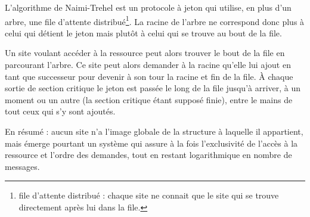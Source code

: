 L'algorithme de Naimi-Trehel est un protocole à jeton qui utilise, en plus d'un arbre, une file d'attente distribué\footnote{file d'attente distribué : chaque site ne connait que le site qui se trouve directement après lui dans la file.}. La racine de l'arbre ne correspond donc plus à celui qui détient le jeton mais plutôt à celui qui se trouve au bout de la file.

Un site voulant accéder à la ressource peut alors trouver le bout de la file en parcourant l'arbre. Ce site peut alors demander à la racine qu'elle lui ajout en tant que successeur pour devenir à son tour la racine et fin de la file. À chaque sortie de section critique le jeton est passée le long de la file jusqu'à arriver, à un moment ou un autre (la section critique étant supposé finie), entre le mains de tout ceux qui s'y sont ajoutés.

En résumé : aucun site n'a l'image globale de la structure à laquelle il appartient, mais émerge pourtant un système qui assure à la fois l'exclusivité de l'accès à la ressource et l'ordre des demandes, tout en restant logarithmique en nombre de messages.